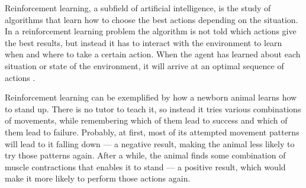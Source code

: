 Reinforcement learning, a subfield of artificial intelligence, is the study of algorithms that learn how to choose the best actions depending on the situation. In a reinforcement learning problem the algorithm is not told which actions give the best results, but instead it has to interact with the environment to learn when and where to take a certain action. When the agent has learned about each situation or state of the environment, it will arrive at an optimal sequence of actions \parencite{barto1998reinforcement}.




Reinforcement learning can be exemplified by how a newborn animal learns how to stand up. There is no tutor to teach it, so instead it tries various combinations of movements, while remembering which of them lead to success and which of them lead to failure. Probably, at first, most of its attempted movement patterns will lead to it falling down --- a negative result, making the animal less likely to try those patterns again. After a while, the animal finds some combination of muscle contractions that enables it to stand --- a positive result, which would make it more likely to perform those actions again. 

